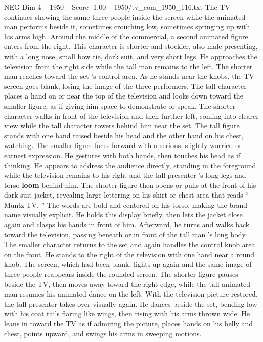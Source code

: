 \begin{textsample}{NEG Dim 4 – 1950 – Score -1.00 – 1950/tv\_com\_1950\_116.txt}
The TV continues showing the same three people inside the screen while the animated man performs beside it, sometimes crouching low, sometimes springing up with his arms high.
Around the middle of the commercial, a second animated figure enters from the right.
This character is shorter and stockier, also male-presenting, with a long nose, small bow tie, dark suit, and very short legs.
He approaches the television from the right side while the tall man remains to the left.
The shorter man reaches toward the set ’s control area.
As he stands near the knobs, the TV screen goes blank, losing the image of the three performers.
The tall character places a hand on or near the top of the television and looks down toward the smaller figure, as if giving him space to demonstrate or speak.
The shorter character walks in front of the television and then further left, coming into clearer view while the tall character towers behind him near the set.
The tall figure stands with one hand raised beside his head and the other hand on his chest, watching.
The smaller figure faces forward with a serious, slightly worried or earnest expression.
He gestures with both hands, then touches his head as if thinking.
He appears to address the audience directly, standing in the foreground while the television remains to his right and the tall presenter ’s long legs and torso \textbf{loom} behind him.
The shorter figure then opens or pulls at the front of his dark suit jacket, revealing large lettering on his shirt or chest area that reads “ Muntz TV. ” The words are bold and centered on his torso, making the brand name visually explicit.
He holds this display briefly, then lets the jacket close again and clasps his hands in front of him.
Afterward, he turns and walks back toward the television, passing beneath or in front of the tall man ’s long body.
The smaller character returns to the set and again handles the control knob area on the front.
He stands to the right of the television with one hand near a round knob.
The screen, which had been blank, lights up again and the same image of three people reappears inside the rounded screen.
The shorter figure pauses beside the TV, then moves away toward the right edge, while the tall animated man resumes his animated dance on the left.
With the television picture restored, the tall presenter takes over visually again.
He dances beside the set, bending low with his coat tails flaring like wings, then rising with his arms thrown wide.
He leans in toward the TV as if admiring the picture, places hands on his belly and chest, points upward, and swings his arms in sweeping motions.

\end{textsample}
